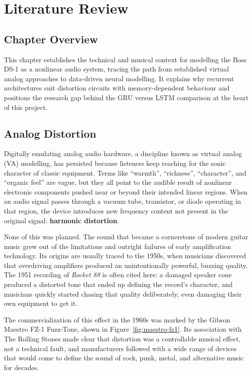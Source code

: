 \chapter{Literature Review}
\label{chap:literature-review}

\section{Chapter Overview}

This chapter establishes the technical and musical context for modelling the Boss DS-1 as a nonlinear audio system, tracing the path from established virtual analog approaches to data-driven neural modelling. It explains why recurrent architectures suit distortion circuits with memory-dependent behaviour and positions the research gap behind the GRU versus LSTM comparison at the heart of this project.

\section{Analog Distortion}

Digitally emulating analog audio hardware, a discipline known as virtual analog (VA) modelling, has persisted because listeners keep reaching for the sonic character of classic equipment. Terms like ``warmth'', ``richness'', ``character'', and ``organic feel'' are vague, but they all point to the audible result of nonlinear electronic components pushed near or beyond their intended linear regions. When an audio signal passes through a vacuum tube, transistor, or diode operating in that region, the device introduces new frequency content not present in the original signal: \textbf{harmonic distortion}.

None of this was planned. The sound that became a cornerstone of modern guitar music grew out of the limitations and outright failures of early amplification technology. Its origins are usually traced to the 1950s, when musicians discovered that overdriving amplifiers produced an unintentionally powerful, buzzing quality. The 1951 recording of \textit{Rocket 88} is often cited here: a damaged speaker cone produced a distorted tone that ended up defining the record's character, and musicians quickly started chasing that quality deliberately, even damaging their own equipment to get it.

The commercialization of this effect in the 1960s was marked by the Gibson Maestro FZ-1 Fuzz-Tone, shown in Figure~\ref{fig:maestro-fz1}. Its association with The Rolling Stones made clear that distortion was a controllable musical effect, not a technical fault, and manufacturers followed with a wide range of devices that would come to define the sound of rock, punk, metal, and alternative music for decades.

